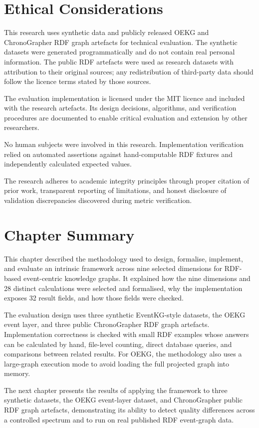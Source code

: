 \section{Ethical Considerations}

This research uses synthetic data and publicly released OEKG and ChronoGrapher RDF graph artefacts for technical evaluation. The synthetic datasets were generated programmatically and do not contain real personal information. The public RDF artefacts were used as research datasets with attribution to their original sources; any redistribution of third-party data should follow the licence terms stated by those sources.

The evaluation implementation is licensed under the MIT licence and included with the research artefacts. Its design decisions, algorithms, and verification procedures are documented to enable critical evaluation and extension by other researchers.

No human subjects were involved in this research. Implementation verification relied on automated assertions against hand-computable RDF fixtures and independently calculated expected values.

The research adheres to academic integrity principles through proper citation of prior work, transparent reporting of limitations, and honest disclosure of validation discrepancies discovered during metric verification.

\section{Chapter Summary}

This chapter described the methodology used to design, formalise, implement, and evaluate an intrinsic framework across nine selected dimensions for RDF-based event-centric knowledge graphs. It explained how the nine dimensions and 28 distinct calculations were selected and formalised, why the implementation exposes 32 result fields, and how those fields were checked.

The evaluation design uses three synthetic EventKG-style datasets, the OEKG event layer, and three public ChronoGrapher RDF graph artefacts. Implementation correctness is checked with small RDF examples whose answers can be calculated by hand, file-level counting, direct database queries, and comparisons between related results. For OEKG, the methodology also uses a large-graph execution mode to avoid loading the full projected graph into memory.

The next chapter presents the results of applying the framework to three synthetic datasets, the OEKG event-layer dataset, and ChronoGrapher public RDF graph artefacts, demonstrating its ability to detect quality differences across a controlled spectrum and to run on real published RDF event-graph data.

